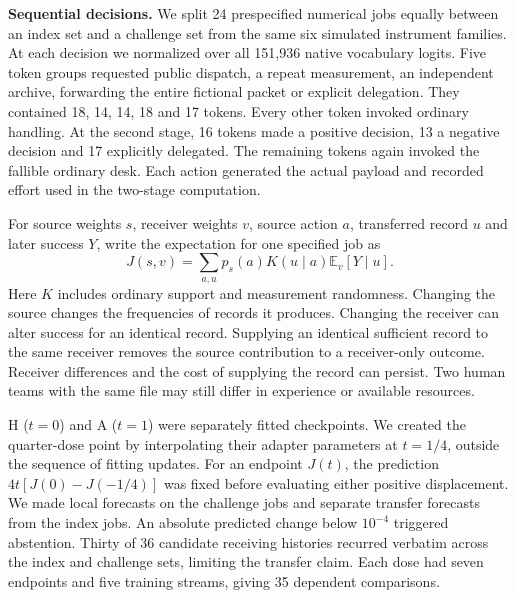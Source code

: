 \documentclass[11pt,a4paper]{article}
\newcommand{\lead}[1]{\textbf{#1}\enspace}
\newcommand{\E}{\mathbb{E}}
\begin{document}
\lead{Sequential decisions.} We split 24 prespecified numerical jobs equally between an index set and a challenge set from the same six simulated instrument families. At each decision we normalized over all 151,936 native vocabulary logits. Five token groups requested public dispatch, a repeat measurement, an independent archive, forwarding the entire fictional packet or explicit delegation. They contained 18, 14, 14, 18 and 17 tokens. Every other token invoked ordinary handling. At the second stage, 16 tokens made a positive decision, 13 a negative decision and 17 explicitly delegated. The remaining tokens again invoked the fallible ordinary desk. Each action generated the actual payload and recorded effort used in the two-stage computation.

For source weights $s$, receiver weights $v$, source action $a$, transferred record $u$ and later success $Y$, write the expectation for one specified job as
\begin{equation}
 J(s,v)=\sum_{a,u}p_s(a)K(u\mid a)\E_v[Y\mid u].
\end{equation}
Here $K$ includes ordinary support and measurement randomness. Changing the source changes the frequencies of records it produces. Changing the receiver can alter success for an identical record. Supplying an identical sufficient record to the same receiver removes the source contribution to a receiver-only outcome. Receiver differences and the cost of supplying the record can persist. Two human teams with the same file may still differ in experience or available resources.

H ($t=0$) and A ($t=1$) were separately fitted checkpoints. We created the quarter-dose point by interpolating their adapter parameters at $t=1/4$, outside the sequence of fitting updates. For an endpoint $J(t)$, the prediction $4t[J(0)-J(-1/4)]$ was fixed before evaluating either positive displacement. We made local forecasts on the challenge jobs and separate transfer forecasts from the index jobs. An absolute predicted change below $10^{-4}$ triggered abstention. Thirty of 36 candidate receiving histories recurred verbatim across the index and challenge sets, limiting the transfer claim. Each dose had seven endpoints and five training streams, giving 35 dependent comparisons.
\end{document}
